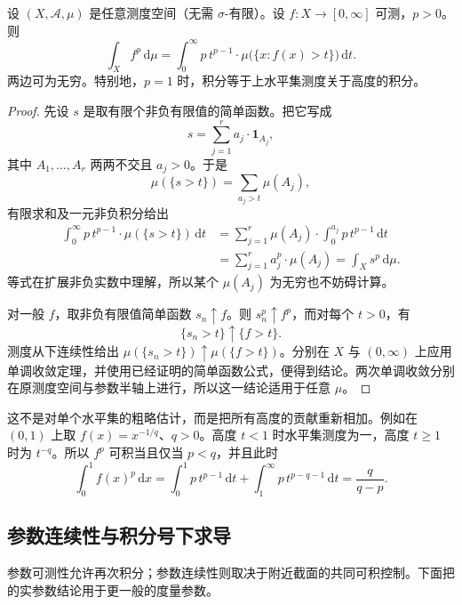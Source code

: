 \begin{proposition}[水平集积分公式]\label{b1:prop:layer-cake-formula}
设 \((X,\mathcal A,\mu)\) 是任意测度空间（无需 \(\sigma\)-有限）。设 \(f:X\rightarrow[0,\infty]\) 可测，\(p>0\)。则
\[
\int_X f^p\,\mathrm d\mu
=\int_0^{\infty}p\,t^{p-1}\cdot \mu\bigl(\{x:f(x)>t\}\bigr)\,\mathrm dt.
\]
两边可为无穷。特别地，\(p=1\) 时，积分等于上水平集测度关于高度的积分。
\end{proposition}
\begin{proof}
先设 \(s\) 是取有限个非负有限值的简单函数。把它写成
\[
s=\sum_{j=1}^r a_j\cdot\mathbf1_{A_j},
\]
其中 \(A_1,\ldots,A_r\) 两两不交且 \(a_j>0\)。于是
\[
\mu(\{s>t\})=\sum_{a_j>t}\mu(A_j),
\]
有限求和及一元非负积分给出
\begin{align*}
\int_0^\infty p\,t^{p-1}\cdot\mu(\{s>t\})\,\mathrm dt
&=\sum_{j=1}^r\mu(A_j)\cdot\int_0^{a_j}p\,t^{p-1}\,\mathrm dt\\
&=\sum_{j=1}^r a_j^p\cdot\mu(A_j)
=\int_Xs^p\,\mathrm d\mu.
\end{align*}
等式在扩展非负实数中理解，所以某个 \(\mu(A_j)\) 为无穷也不妨碍计算。

对一般 \(f\)，取非负有限值简单函数 \(s_n\uparrow f\)。则 \(s_n^p\uparrow f^p\)，而对每个 \(t>0\)，有
\[
\{s_n>t\}\uparrow\{f>t\}.
\]
测度从下连续性给出 \(\mu(\{s_n>t\})\uparrow\mu(\{f>t\})\)。分别在 \(X\) 与 \((0,\infty)\) 上应用单调收敛定理，并使用已经证明的简单函数公式，便得到结论。两次单调收敛分别在原测度空间与参数半轴上进行，所以这一结论适用于任意 \(\mu\)。
\end{proof}

这不是对单个水平集的粗略估计，而是把所有高度的贡献重新相加。例如在 \((0,1)\) 上取 \(f(x)=x^{-1/q}\)、\(q>0\)。高度 \(t<1\) 时水平集测度为一，高度 \(t\geq1\) 时为 \(t^{-q}\)。所以 \(f^p\) 可积当且仅当 \(p<q\)，并且此时
\[
\int_0^1f(x)^p\,\mathrm dx
=\int_0^1p\,t^{p-1}\,\mathrm dt+\int_1^{\infty}p\,t^{p-q-1}\,\mathrm dt
=\frac{q}{q-p}.
\]

\subsection{参数连续性与积分号下求导}
\label{b1:subsec:070404}

参数可测性允许再次积分；参数连续性则取决于附近截面的共同可积控制。下面把的实参数结论用于更一般的度量参数。

